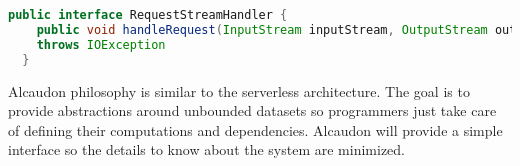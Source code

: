 \begin{lstlisting}[language=java, frame=trBL, label=code:lambdalisting, float=ht, caption = {AWS Lambda Interface}]
  public interface RequestStreamHandler {
    public void handleRequest(InputStream inputStream, OutputStream outputStream, Context context)
    throws IOException
  }
\end{lstlisting}

Alcaudon philosophy is similar to the serverless architecture. The goal is to
provide abstractions around unbounded datasets so programmers just take care of
defining their computations and dependencies. Alcaudon will provide a simple
interface so the details to know about the system are minimized.

